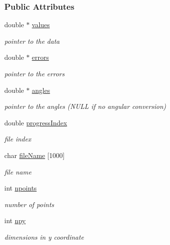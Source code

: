\subsubsection*{Public Attributes}
\begin{CompactItemize}
\item 
double $\ast$ \hyperlink{classdetectorData_0f4e31d65f9616e83a2e5521453d0364}{values}
\begin{CompactList}\small\item\em pointer to the data \item\end{CompactList}\item 
double $\ast$ \hyperlink{classdetectorData_29cb1c6bb5635e918ae28505ccd0d8f9}{errors}
\begin{CompactList}\small\item\em pointer to the errors \item\end{CompactList}\item 
double $\ast$ \hyperlink{classdetectorData_cc9f9708b9ff2d840208cae843fb4b7a}{angles}
\begin{CompactList}\small\item\em pointer to the angles (NULL if no angular conversion) \item\end{CompactList}\item 
double \hyperlink{classdetectorData_976b3287d46aed032487bbeed74132da}{progress\-Index}
\begin{CompactList}\small\item\em file index \item\end{CompactList}\item 
char \hyperlink{classdetectorData_91d1e3466878def295a531c01bdeef6b}{file\-Name} \mbox{[}1000\mbox{]}
\begin{CompactList}\small\item\em file name \item\end{CompactList}\item 
int \hyperlink{classdetectorData_50aabf6f2c40587f8e915cf4913a2cfe}{npoints}
\begin{CompactList}\small\item\em number of points \item\end{CompactList}\item 
int \hyperlink{classdetectorData_c289d259e7fd9445a9c04976a82cb324}{npy}
\begin{CompactList}\small\item\em dimensions in y coordinate \item\end{CompactList}\end{CompactItemize}



